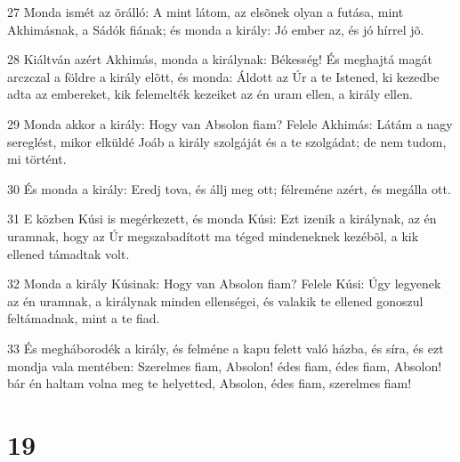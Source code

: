 \par 27 Monda ismét az õrálló: A mint látom, az elsõnek olyan a futása, mint Akhimásnak, a Sádók fiának; és monda a király: Jó ember az, és jó hírrel jõ.
\par 28 Kiáltván azért Akhimás, monda a királynak: Békesség! És meghajtá magát arczczal a földre a király elõtt, és monda: Áldott az Úr a te Istened, ki kezedbe adta az embereket, kik felemelték kezeiket az én uram ellen, a király ellen.
\par 29 Monda akkor a király: Hogy van Absolon fiam? Felele Akhimás: Látám a nagy sereglést, mikor elküldé Joáb a király szolgáját és a te szolgádat; de nem tudom, mi történt.
\par 30 És monda a király: Eredj tova, és állj meg ott; félreméne azért, és megálla ott.
\par 31 E közben Kúsi is megérkezett, és monda Kúsi: Ezt izenik a királynak, az én uramnak, hogy az Úr megszabadított ma téged mindeneknek kezébõl, a kik ellened támadtak volt.
\par 32 Monda a király Kúsinak: Hogy van Absolon fiam? Felele Kúsi: Úgy legyenek az én uramnak, a királynak minden ellenségei, és valakik te ellened gonoszul feltámadnak, mint a te fiad.
\par 33 És megháborodék a király, és felméne a kapu felett való házba, és síra, és ezt mondja vala mentében: Szerelmes fiam, Absolon! édes fiam, édes fiam, Absolon! bár én haltam volna meg te helyetted, Absolon, édes fiam, szerelmes fiam!

\chapter{19}

